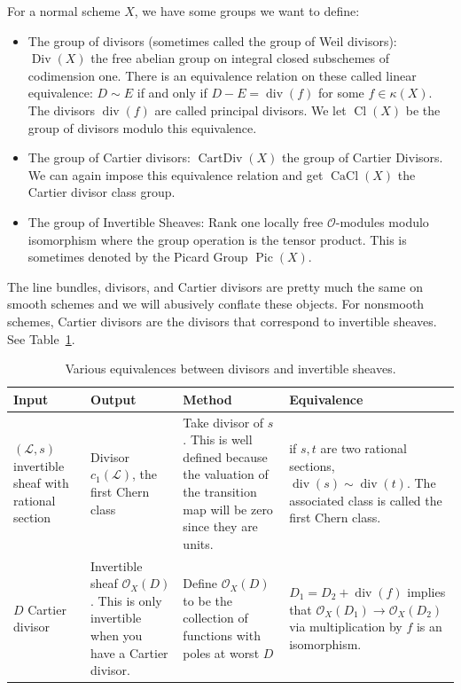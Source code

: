 \documentclass[12pt]{article}
\numberwithin{equation}{section}
\theoremstyle{definition}
\theoremstyle{remark}
\newcommand{\Ocal}{\mathcal{O}}
\newcommand{\Div}{\operatorname{Div}}
\newcommand{\CartDiv}{\operatorname{CartDiv}}
\newcommand{\CaCl}{\operatorname{CaCl}}
\newcommand{\Pic}{\operatorname{Pic}}
\renewcommand{\div}{\operatorname{div}}
\newcommand{\Cl}{\operatorname{Cl}}
\newcommand{\Lcal}{\mathcal{L}}
\begin{document}
For a normal scheme $X$, we have some groups we want to define:
\begin{itemize}
	\item The group of divisors (sometimes called the group of Weil divisors): $\Div(X)$ the free abelian group on integral closed subschemes of codimension one.
	There is an equivalence relation on these called linear equivalence: $D \sim E$ if and only if $D-E = \div(f)$ for some $f \in \kappa(X)$. 
	The divisors $\div(f)$ are called principal divisors.
	We let $\Cl(X)$ be the group of divisors modulo this equivalence. 
	\item The group of Cartier divisors: $\CartDiv(X)$ the group of Cartier Divisors. 
	We can again impose this equivalence relation and get $\CaCl(X)$ the Cartier divisor class group. 
	\item The group of Invertible Sheaves: Rank one locally free $\mathcal O$-modules modulo isomorphism where the group operation is the tensor product. This is sometimes denoted by the Picard Group $\Pic(X)$.
\end{itemize}
The line bundles, divisors, and Cartier divisors are pretty much the same on smooth schemes and we will abusively conflate these objects.
For nonsmooth schemes, Cartier divisors are the divisors that correspond to invertible sheaves. 
See Table~\ref{tab:invertible-and-divisors}.
\begin{table}[h]
	\begin{center}
		\begin{longtable}{|p{1in}|p{1in}|p{2in}|p{2in}|}
			\hline Input & Output & Method & Equivalence \\ \hline
			$(\Lcal,s)$ invertible sheaf with rational section & Divisor $c_1(\Lcal)$, the first Chern class & Take divisor of $s$.
			This is well defined because the valuation of the transition map will be zero since they are units. & if $s,t$ are two rational sections, $\div(s) \sim \div(t)$. 
			The associated class is called the first Chern class.\\ \hline
			$D$ Cartier divisor & Invertible sheaf $\Ocal_X(D)$.
			This is only invertible when you have a Cartier divisor. & Define $\Ocal_X(D)$ to be the collection of functions with poles at worst $D$ & $D_1= D_2 +\div(f)$ implies that $\Ocal_X(D_1) \to \Ocal_X(D_2)$ via multiplication by $f$ is an isomorphism. \\ \hline
		\end{longtable}
	\end{center}
	\caption{Various equivalences between divisors and invertible sheaves.}\label{tab:invertible-and-divisors}
\end{table}
\end{document}
